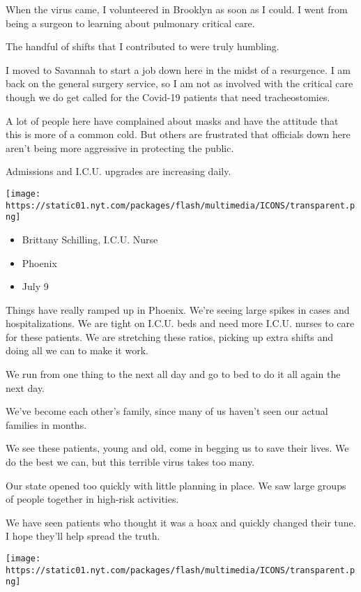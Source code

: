 When the virus came, I volunteered in Brooklyn as soon as I could. I
went from being a surgeon to learning about pulmonary critical care.

The handful of shifts that I contributed to were truly humbling.

I moved to Savannah to start a job down here in the midst of a
resurgence. I am back on the general surgery service, so I am not as
involved with the critical care though we do get called for the Covid-19
patients that need tracheostomies.

A lot of people here have complained about masks and have the attitude
that this is more of a common cold. But others are frustrated that
officials down here aren't being more aggressive in protecting the
public.

Admissions and I.C.U. upgrades are increasing daily.

\texttt{[image: https://static01.nyt.com/packages/flash/multimedia/ICONS/transparent.png]}

\begin{itemize}
\tightlist
\item
  Brittany Schilling, I.C.U. Nurse
\item
  Phoenix
\item
  July 9
\end{itemize}

Things have really ramped up in Phoenix. We're seeing large spikes in
cases and hospitalizations. We are tight on I.C.U. beds and need more
I.C.U. nurses to care for these patients. We are stretching these
ratios, picking up extra shifts and doing all we can to make it work.

We run from one thing to the next all day and go to bed to do it all
again the next day.

We've become each other's family, since many of us haven't seen our
actual families in months.

We see these patients, young and old, come in begging us to save their
lives. We do the best we can, but this terrible virus takes too many.

Our state opened too quickly with little planning in place. We saw large
groups of people together in high-risk activities.

We have seen patients who thought it was a hoax and quickly changed
their tune. I hope they'll help spread the truth.

\texttt{[image: https://static01.nyt.com/packages/flash/multimedia/ICONS/transparent.png]}

